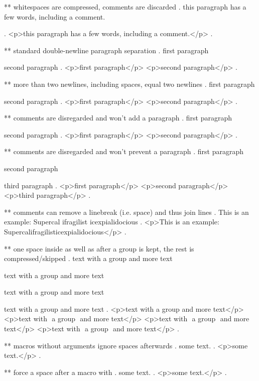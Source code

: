** whitespaces are compressed, comments are discarded
.
   this     paragraph  has a    few 
 words,   including
 a comment.


 
.
<p>this paragraph has a few words, including a comment.</p>
.



** standard double-newline paragraph separation
.
first paragraph

 second paragraph
.
<p>ﬁrst paragraph</p>
<p>second paragraph</p>
.



** more than two newlines, including spaces, equal two newlines
.
first paragraph

   
  


second paragraph
.
<p>ﬁrst paragraph</p>
<p>second paragraph</p>
.


** comments are disregarded and won't add a paragraph
.
first paragraph




second paragraph
.
<p>ﬁrst paragraph</p>
<p>second paragraph</p>
.

** comments are disregarded and won't prevent a paragraph
.
first paragraph %

second paragraph%

third paragraph
.
<p>ﬁrst paragraph</p>
<p>second paragraph</p>
<p>third paragraph</p>
.


** comments can remove a linebreak (i.e. space) and thus join lines
.
This is an %
example: Supercal%
              ifragilist%
    icexpialidocious
.
<p>This is an example: Supercalifragilisticexpialidocious</p>
.



** one space inside as well as after a group is kept, the rest is compressed/skipped
.
text with {a group} and more text

text with { a group } and more text

text with { a group  } and more text

text with {  a group  }  and more text
.
<p>text with a group​ and more text</p>
<p>text with ​ a group ​ and more text</p>
<p>text with ​ a group ​ and more text</p>
<p>text with ​ a group ​ and more text</p>
.

** macros without arguments ignore spaces afterwards
.
some \echo  text.
.
<p>some text.</p>
.

** force a space after a macro with {}
.
some \echo{} text.
.
<p>some ​ text.</p>
.
